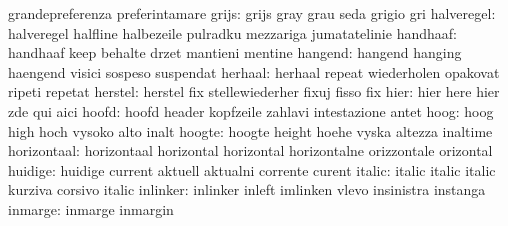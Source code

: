                            grandepreferenza          preferintamare
                    grijs: grijs                     gray
                           grau                      seda
                           grigio                    gri
               halveregel: halveregel                halfline
                           halbezeile                pulradku
                           mezzariga                 jumatatelinie
                 handhaaf: handhaaf                  keep
                           behalte                   drzet
                           mantieni                  mentine
                  hangend: hangend                   hanging
                           haengend                  visici
                           sospeso                   suspendat
                  herhaal: herhaal                   repeat
                           wiederholen               opakovat
                           ripeti                    repetat
                  herstel: herstel                   fix
                           stellewiederher           fixuj
                           fisso                     fix
                     hier: hier                      here
                           hier                      zde
                           qui                       aici
                    hoofd: hoofd                     header
                           kopfzeile                 zahlavi
                           intestazione              antet
                     hoog: hoog                      high
                           hoch                      vysoko
                           alto                      inalt
                   hoogte: hoogte                    height
                           hoehe                     vyska
                           altezza                   inaltime
              horizontaal: horizontaal               horizontal
                           horizontal                horizontalne
                           orizzontale               orizontal
                  huidige: huidige                   current
                           aktuell                   aktualni
                           corrente                  curent
                   italic: italic                    italic
                           italic                    kurziva
                           corsivo                   italic
                 inlinker: inlinker                  inleft
                           imlinken                  vlevo
                           insinistra                instanga
                  inmarge: inmarge                   inmargin
